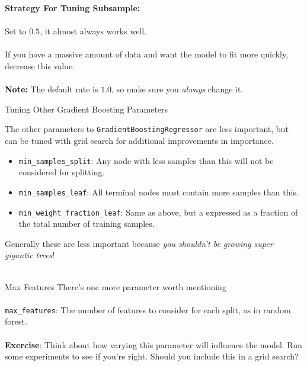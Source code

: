 \begin{frame}
\textbf{Strategy For Tuning Subsample:}\\~\\

Set to $0.5$, it almost always works well.\\~\\

If you have a massive amount of data and want the model to fit more quickly, decrease this value.\\~\\

\textbf{Note:} The default rate is $1.0$, so make sure you \textit{always} change it.
\end{frame}
%
\begin{frame}{Tuning Other Gradient Boosting Parameters}

The other parameters to \texttt{GradientBoostingRegressor} are less important, but can be tuned with grid search for additional improvements in importance.

\begin{itemize}
  \item \texttt{min\_samples\_split}: Any node with less samples than this will not be considered for splitting.
  \item \texttt{min\_samples\_leaf}: All terminal nodes must contain more samples than this.
  \item \texttt{min\_weight\_fraction\_leaf}: Same as above, but a expressed as a fraction of the total number of training samples.
\end{itemize}

\end{frame}
%
\begin{frame}
Generally these are less important because \textit{you shouldn't be growing super gigantic trees}!\\~\\


\end{frame}
%
\begin{frame}{Max Features}
There's one more parameter worth mentioning\\~\\

\texttt{max\_features}: The number of features to consider for each split, as in random forest.\\~\\

\textbf{Exercise}: Think about how varying this parameter will influence the model.  Run some experiments to see if you're right.  Should you include this in a grid search?
\end{frame}
  
  
